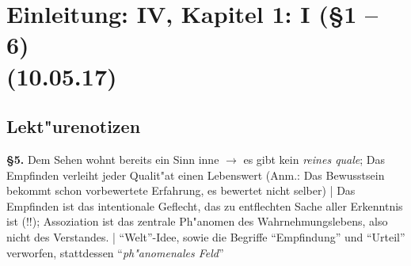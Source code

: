 \documentclass[emulatestandardclasses]{scrartcl}
\begin{document}
\section{Einleitung: IV, Kapitel 1: I (\S 1 -- 6)\\(10.05.17)}

\subsection{Lekt"urenotizen}

\textbf{\S 5.} Dem Sehen wohnt bereits ein Sinn inne $\rightarrow$ es gibt kein \emph{reines quale}; Das Empfinden verleiht jeder Qualit"at einen Lebenswert (Anm.: Das Bewusstsein bekommt schon vorbewertete Erfahrung, es bewertet nicht selber) | Das Empfinden ist das intentionale Geflecht, das zu entflechten Sache aller Erkenntnis ist (!!); Assoziation ist das zentrale Ph"anomen des Wahrnehmungslebens, also nicht des Verstandes. | "`Welt"'-Idee, sowie die Begriffe "`Empfindung"' und "`Urteil"' verworfen, stattdessen "`\emph{ph"anomenales Feld}"'

\newpage
%


\end{document}
